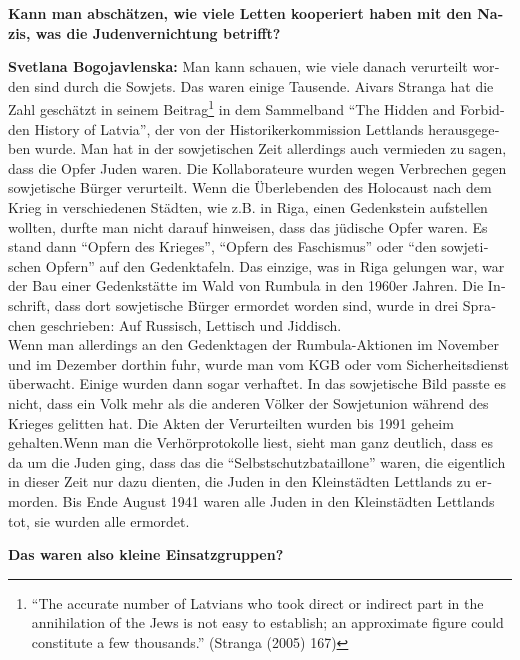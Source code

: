 \begin{otherlanguage}{ngerman}
\textbf{Kann man abschätzen, wie viele Letten kooperiert haben mit den Nazis, was die Judenvernichtung betrifft?}

\textbf{Svetlana Bogojavlenska:} Man kann schauen, wie viele danach verurteilt worden sind durch die Sowjets. Das waren einige Tausende. Aivars Stranga hat die Zahl geschätzt in seinem Beitrag\footnote{``The accurate number of Latvians who took direct or indirect part in the annihilation of the Jews is not easy to establish; an approximate figure could constitute a few thousands.'' (Stranga (2005) 167) } in dem Sammelband "`The Hidden and Forbidden History of Latvia"', der von der Historikerkommission Lettlands herausgegeben wurde. Man hat in der sowjetischen Zeit allerdings auch vermieden zu sagen, dass die Opfer Juden waren. Die Kollaborateure wurden wegen Verbrechen gegen sowjetische Bürger verurteilt. Wenn die Überlebenden des Holocaust nach dem Krieg in verschiedenen Städten, wie z.B. in Riga, einen Gedenkstein aufstellen wollten, durfte man nicht darauf hinweisen, dass das jüdische Opfer waren. Es stand dann "`Opfern des Krieges"', "`Opfern des Faschismus"' oder "`den sowjetischen Opfern"' auf den Gedenktafeln. Das einzige, was in Riga gelungen war, war der Bau einer Gedenkstätte im Wald von Rumbula in den 1960er Jahren. Die Inschrift, dass dort sowjetische Bürger ermordet worden sind, wurde in drei Sprachen geschrieben: Auf Russisch, Lettisch und Jiddisch.\\ 
Wenn man allerdings an den Gedenktagen der Rumbula-Aktionen im November und im Dezember dorthin fuhr, wurde man vom KGB oder vom Sicherheitsdienst überwacht. Einige wurden dann sogar verhaftet. In das sowjetische Bild passte es nicht, dass ein Volk mehr als die anderen Völker der Sowjetunion während des Krieges gelitten hat. Die Akten der Verurteilten wurden bis 1991 geheim gehalten.Wenn man die Verhörprotokolle liest, sieht man ganz deutlich, dass es da um die Juden ging, dass das die "`Selbstschutzbataillone"' waren, die eigentlich in dieser Zeit nur dazu dienten, die Juden in den Kleinstädten Lettlands zu ermorden. Bis Ende August 1941 waren alle Juden in den Kleinstädten Lettlands tot, sie wurden alle ermordet.
 
\textbf{Das waren also kleine Einsatzgruppen?}


\end{otherlanguage}
